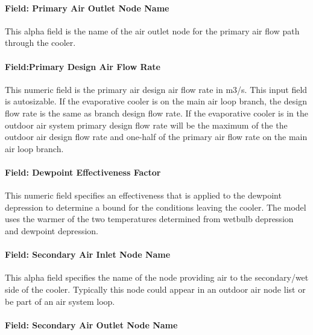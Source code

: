 \paragraph{Field: Primary Air Outlet Node Name}\label{field-primary-air-outlet-node-name-2}

This alpha field is the name of the air outlet node for the primary air flow path through the cooler.

\paragraph{Field:Primary Design Air Flow Rate}\label{fieldprimary-design-air-flow-rate-1}

This numeric field is the primary air design air flow rate in m3/s. This input field is autosizable. If the evaporative cooler is on the main air loop branch, the design flow rate is the same as branch design flow rate. If the evaporative cooler is in the outdoor air system primary design flow rate will be the maximum of the the outdoor air design flow rate and one-half of the primary air flow rate on the main air loop branch.

\paragraph{Field: Dewpoint Effectiveness Factor}\label{field-dewpoint-effectiveness-factor}

This numeric field specifies an effectiveness that is applied to the dewpoint depression to determine a bound for the conditions leaving the cooler. The model uses the warmer of the two temperatures determined from wetbulb depression and dewpoint depression.

\paragraph{Field: Secondary Air Inlet Node Name}\label{field-secondary-air-inlet-node-name-2}

This alpha field specifies the name of the node providing air to the secondary/wet side of the cooler. Typically this node could appear in an outdoor air node list or be part of an air system loop.

\paragraph{Field: Secondary Air Outlet Node Name}\label{field-secondary-air-outlet-node-name}

